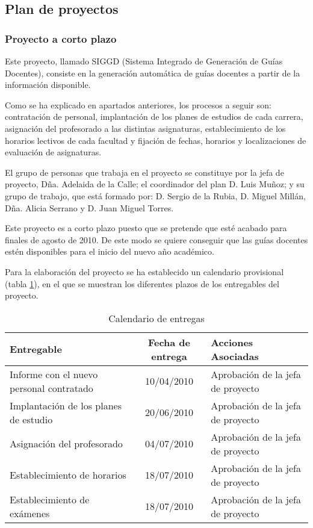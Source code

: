 \documentclass[11pt,a4paper,spanish,twoside]{report}
\begin{document}
\subsection{Plan de proyectos} \label{ss:8.1.1}
\subsubsection{Proyecto a corto plazo}
Este proyecto, llamado SIGGD (Sistema Integrado de Generación de Guías 
Docentes), consiste en la generación automática de guías docentes a partir de
la información disponible.

Como se ha explicado en apartados anteriores, los procesos a seguir son:
contratación de personal, implantación de los planes de estudios de cada 
carrera, asignación del profesorado a las distintas asignaturas, 
establecimiento de los horarios lectivos de cada facultad y fijación de 
fechas, horarios y localizaciones de evaluación de asignaturas.

El grupo de personas que trabaja en el proyecto se constituye por la
jefa de proyecto, Dña. Adelaida de la Calle; el coordinador del plan D. Luis
Muñoz; y su grupo de trabajo, que está formado por: D. Sergio de la Rubia,
D. Miguel Millán, Dña. Alicia Serrano y D. Juan Miguel Torres.

Este proyecto es a corto plazo puesto que se pretende que esté acabado para 
finales de agosto de 2010. De este modo se quiere conseguir que las guías 
docentes estén disponibles para el inicio del nuevo año académico.

Para la elaboración del proyecto se ha establecido un calendario provisional
(tabla \ref{tab:cal}), en el que se muestran los diferentes plazos de los 
entregables del proyecto.

\begin{table}[!h]
\centering
  \begin{tabular}{p{4cm}cp{3.7cm}}
    \textbf{Entregable} & \textbf{Fecha de entrega} &
    \textbf{Acciones Asociadas} \\
    \hline \hline
    Informe con el nuevo personal contratado & 10/04/2010 & Aprobación de la 
    jefa de proyecto\\ \hline
    Implantación de los planes de estudio & 20/06/2010 & Aprobación de la jefa 
    de proyecto\\ \hline
    Asignación del profesorado & 04/07/2010 & Aprobación de la jefa de 
    proyecto\\ \hline
    Establecimiento de horarios & 18/07/2010 & Aprobación de la jefa de 
    proyecto\\ \hline
    Establecimiento de exámenes & 18/07/2010 & Aprobación de la jefa de 
    proyecto\\ \hline
  \end{tabular}
\caption{Calendario de entregas}\label{tab:cal}
\end{table}
\end{document}
